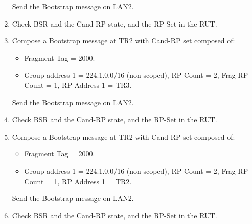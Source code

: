 \documentclass[11pt]{report}
\begin{document}
\begin{enumerate}
\begin{itemize}
  \end{itemize}

  Send the Bootstrap message on LAN2.

  \item Check BSR and the Cand-RP state, and the RP-Set in the RUT.

  \item Compose a Bootstrap message at TR2 with Cand-RP set composed of:

  \begin{itemize}

    \item Fragment Tag = 2000.

    \item Group address 1 = 224.1.0.0/16 (non-scoped),
    RP Count = 2, Frag RP Count = 1, RP Address 1 = TR3.

  \end{itemize}

  Send the Bootstrap message on LAN2.

  \item Check BSR and the Cand-RP state, and the RP-Set in the RUT.

  \item Compose a Bootstrap message at TR2 with Cand-RP set composed of:

  \begin{itemize}

    \item Fragment Tag = 2000.

    \item Group address 1 = 224.1.0.0/16 (non-scoped),
    RP Count = 2, Frag RP Count = 1, RP Address 1 = TR2.

  \end{itemize}

  Send the Bootstrap message on LAN2.

  \item Check BSR and the Cand-RP state, and the RP-Set in the RUT.

\end{enumerate}

\end{document}
